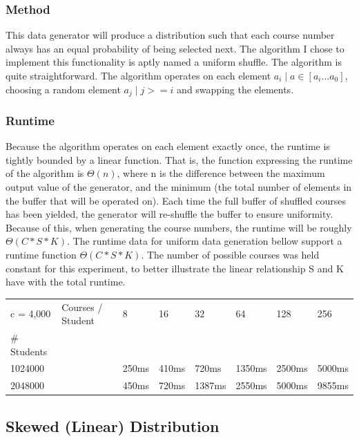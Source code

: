 \documentclass[11pt]{article}
\begin{document}
        \subsubsection {Method}
            This data generator will produce a distribution such that each course number always has an equal probability of being selected next. The algorithm I chose to implement this functionality is aptly named a uniform shuffle. The algorithm is quite straightforward. The algorithm operates on each element $a_i \mid a \in [a_i...a_0]$, choosing a random element $a_j \mid j >= i$ and swapping the elements.
        \subsubsection{Runtime}
            Because the algorithm operates on each element exactly once, the runtime is tightly bounded by a linear function. That is, the function expressing the runtime of the algorithm is $\Theta(n)$, where n is the difference between the maximum output value of the generator, and the minimum (the total number of elements in the buffer that will be operated on). Each time the full buffer of shuffled courses has been yielded, the generator will re-shuffle the buffer to ensure uniformity. Because of this, when generating the course numbers, the runtime will be roughly $\Theta(C *S * K )$. The runtime data for uniform data generation bellow support a runtime function $\Theta(C*S*K)$. The number of possible courses was held constant for this experiment, to better illustrate the linear relationship S and K have with the total runtime.

	\begin{table}[h!]
	\begin{tabular}{llllllll}
	c = 4,000   & Courses / Student & 8    & 16   & 32   & 64   & 128  & 256  \\
	\# Students &                   &        &       &       &       &       &       \\
	1024000         &                   & 250ms & 410ms  & 720ms & 1350ms & 2500ms  & 5000ms \\
	2048000         &                   & 450ms  & 720ms & 1387ms & 2550ms & 5000ms & 9855ms \\
	\end{tabular}
	\end{table}
    \subsection{Skewed (Linear) Distribution}
\end{document}
